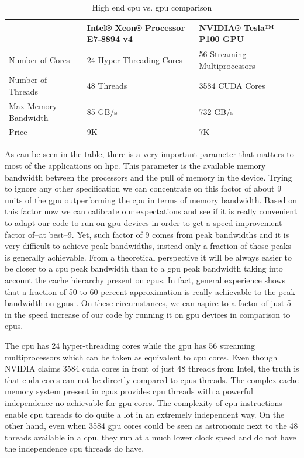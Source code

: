 \documentclass[11pt,a4paper]{article}
\begin{document}
\begin{table}[h!]
\centering
\caption{High end \gls{cpu} vs. \gls{gpu} comparison}
\begin{tabular}{|l|l|l|}
\hline
                     & Intel® Xeon® Processor E7-8894 v4 & NVIDIA® Tesla™ P100 GPU \\ \hline
Number of Cores      & 24 Hyper-Threading Cores          & 56 Streaming Multiprocessors   \\ \hline
Number of Threads    & 48 Threads                        & 3584 CUDA Cores    \\ \hline
Max Memory Bandwidth & 85 GB/s                           & 732 GB/s                \\ \hline
Price                & 9K                                & 7K                      \\ \hline
\end{tabular}
\label{CPU_GPU_Comparison}
\end{table}

As can be seen in the table, there is a very important parameter that matters to most of the applications on \gls{hpc}. This parameter is the available memory bandwidth between the processors and the pull of memory in the device. Trying to ignore any other specification we can concentrate on this factor of about 9 units of the \gls{gpu} outperforming the \gls{cpu} in terms of memory bandwidth. Based on this factor now we can calibrate our expectations and see if it is really convenient to adapt our code to run on \gls{gpu} devices in order to get a speed improvement factor of--at best--9. Yet, such factor of 9 comes from peak bandwidths and it is very difficult to achieve peak bandwidths, instead only a fraction of those peaks is generally achievable. From a theoretical perspective it will be always easier to be closer to a \gls{cpu} peak bandwidth than to a \gls{gpu} peak bandwidth taking into account the cache hierarchy present on \glspl{cpu}. In fact, general experience shows that a fraction of 50 to 60 percent approximation is really achievable to the peak bandwidth on \glspl{gpu} \cite{}. On these circumstances, we can aspire to a factor of just 5 in the speed increase of our code by running it on \gls{gpu} devices in comparison to \glspl{cpu}.

The \gls{cpu} has 24 hyper-threading cores while the \gls{gpu} has 56 streaming multiprocessors which can be taken as equivalent to \gls{cpu} cores. Even though NVIDIA claims 3584 \gls{cuda} cores in front of just 48 threads from Intel, the truth is that \gls{cuda} cores can not be directly compared to \glspl{cpu} threads. The complex cache memory system present in \glspl{cpu} provides \gls{cpu} threads with a powerful independence no achievable for \gls{gpu} cores. The complexity of \gls{cpu} instructions enable \gls{cpu} threads to do quite a lot in an extremely independent way. On the other hand, even when  3584 \gls{gpu} cores could be seen as astronomic next to the 48 threads available in a \gls{cpu}, they run at a much lower clock speed and do not have the independence \gls{cpu} threads do have.
\end{document}
